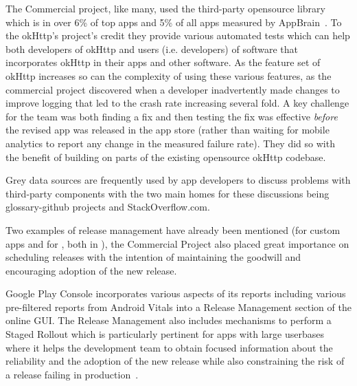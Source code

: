 The Commercial project, like many, used the third-party opensource  library which is in over 6\% of top apps and 5\% of all apps measured by AppBrain~.
%
To the okHttp's project's credit they provide various automated tests which can help both developers of okHttp and users (i.e. developers) of software that incorporates okHttp in their apps and other software. As the feature set of okHttp increases so can the complexity of using these various features, as the commercial project discovered when a developer inadvertently made changes to improve logging that led to the crash rate increasing several fold. A key challenge for the team was both finding a fix and then testing the fix was effective \emph{before} the revised app was released in the app store (rather than waiting for mobile analytics to report any change in the measured failure rate). They did so with the benefit of building on parts of the existing opensource okHttp codebase.

Grey data sources are frequently used by app developers to discuss problems with third-party components with the two main homes for these discussions being \gls{glossary-github} projects and StackOverflow.com.


Two examples of release management have already been mentioned (for  custom apps and for , both in ), the Commercial Project also placed great importance on scheduling releases with the intention of maintaining the goodwill and encouraging adoption of the new release. 

Google Play Console incorporates various aspects of its reports including various pre-filtered reports from Android Vitals into a Release Management section of the online GUI. The Release Management also includes mechanisms to perform a Staged Rollout which is particularly pertinent for apps with large userbases where it helps the development team to obtain focused information about the reliability and the adoption of the new release while also constraining the risk of a release failing in production~. 

